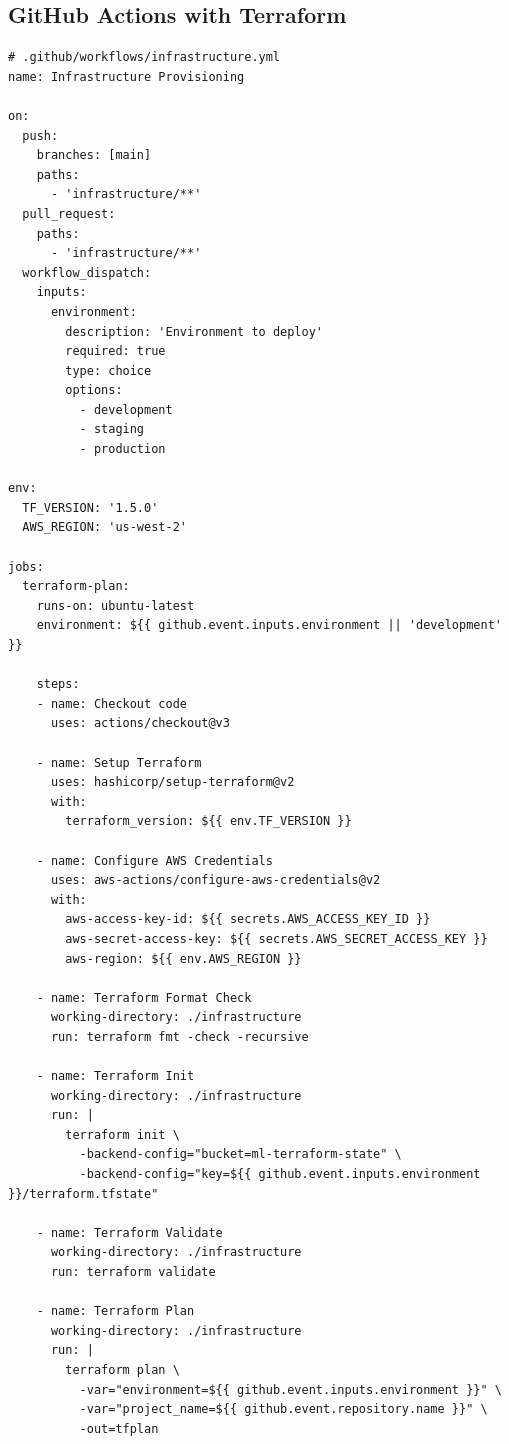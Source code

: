 \subsection{GitHub Actions with Terraform}

\begin{lstlisting}[style=yaml, caption=Infrastructure Provisioning in CI/CD]
# .github/workflows/infrastructure.yml
name: Infrastructure Provisioning

on:
  push:
    branches: [main]
    paths:
      - 'infrastructure/**'
  pull_request:
    paths:
      - 'infrastructure/**'
  workflow_dispatch:
    inputs:
      environment:
        description: 'Environment to deploy'
        required: true
        type: choice
        options:
          - development
          - staging
          - production

env:
  TF_VERSION: '1.5.0'
  AWS_REGION: 'us-west-2'

jobs:
  terraform-plan:
    runs-on: ubuntu-latest
    environment: ${{ github.event.inputs.environment || 'development' }}

    steps:
    - name: Checkout code
      uses: actions/checkout@v3

    - name: Setup Terraform
      uses: hashicorp/setup-terraform@v2
      with:
        terraform_version: ${{ env.TF_VERSION }}

    - name: Configure AWS Credentials
      uses: aws-actions/configure-aws-credentials@v2
      with:
        aws-access-key-id: ${{ secrets.AWS_ACCESS_KEY_ID }}
        aws-secret-access-key: ${{ secrets.AWS_SECRET_ACCESS_KEY }}
        aws-region: ${{ env.AWS_REGION }}

    - name: Terraform Format Check
      working-directory: ./infrastructure
      run: terraform fmt -check -recursive

    - name: Terraform Init
      working-directory: ./infrastructure
      run: |
        terraform init \
          -backend-config="bucket=ml-terraform-state" \
          -backend-config="key=${{ github.event.inputs.environment }}/terraform.tfstate"

    - name: Terraform Validate
      working-directory: ./infrastructure
      run: terraform validate

    - name: Terraform Plan
      working-directory: ./infrastructure
      run: |
        terraform plan \
          -var="environment=${{ github.event.inputs.environment }}" \
          -var="project_name=${{ github.event.repository.name }}" \
          -out=tfplan


\end{lstlisting}
